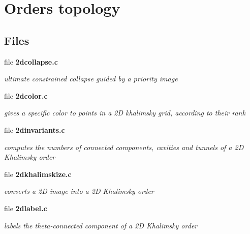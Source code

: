 \section{Orders topology}
\label{group__orders}
\subsection*{Files}
\begin{DoxyCompactItemize}
\item 
file {\bf 2dcollapse.c}


\begin{DoxyCompactList}\small\item\em ultimate constrained collapse guided by a priority image \item\end{DoxyCompactList}

\item 
file {\bf 2dcolor.c}


\begin{DoxyCompactList}\small\item\em gives a specific color to points in a 2D khalimsky grid, according to their rank \item\end{DoxyCompactList}

\item 
file {\bf 2dinvariants.c}


\begin{DoxyCompactList}\small\item\em computes the numbers of connected components, cavities and tunnels of a 2D Khalimsky order \item\end{DoxyCompactList}

\item 
file {\bf 2dkhalimskize.c}


\begin{DoxyCompactList}\small\item\em converts a 2D image into a 2D Khalimsky order \item\end{DoxyCompactList}

\item 
file {\bf 2dlabel.c}


\begin{DoxyCompactList}\small\item\em labels the theta-\/connected component of a 2D Khalimsky order \item\end{DoxyCompactList}


\end{DoxyCompactItemize}
